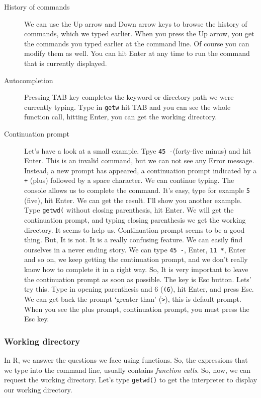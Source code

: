 \documentclass[
]{book}
\begin{document}
\begin{description}
\item[History of commands]
We can use the Up arrow and Down arrow keys to
browse the history of commands, which we typed earlier. When you
press the Up arrow, you get the commands you typed
earlier at the command line. Of course you can modify them as well.
You can hit Enter at any time to run the command that is
currently displayed.
\item[Autocompletion]
Pressing TAB key completes the keyword or directory path
we were currently typing. Type in \texttt{getw} hit TAB and you
can see the whole function call, hitting Enter, you can
get the working directory.
\item[Continuation prompt]
Let's have a look at a small example. Tpye \texttt{45\ -}(forty-five minus)
and hit Enter. This is an invalid command, but we can not
see any Error message. Instead, a new prompt has appeared, a
continuation prompt indicated by a \texttt{+} (plus) followed by a space
character. We can continue typing. The console allows us to complete
the command. It's easy, type for example \texttt{5} (five), hit
Enter. We can get the result. I'll show you another
example. Type \texttt{getwd(} without closing parenthesis, hit
Enter. We will get the continuation prompt, and typing
closing parenthesis we get the working directory. It seems to help
us. Continuation prompt seems to be a good thing. But, It is not. It
is a really confusing feature. We can easily find ourselves in a
never ending story. We can type \texttt{45\ -}, Enter, \texttt{11\ *},
Enter and so on, we keep getting the continuation prompt,
and we don't really know how to complete it in a right way. So, It
is very important to leave the continuation prompt as soon as
possible. The key is Esc button. Lets' try this. Type in
opening parenthesis and 6 (\texttt{(6}), hit Enter, and press
Esc. We can get back the prompt `greater than' (\texttt{\textgreater{}}),
this is default prompt. When you see the plus prompt, continuation
prompt, you must press the Esc key.
\end{description}

\hypertarget{working-directory}{%
\subsubsection{Working directory}\label{working-directory}}

In R, we answer the questions we face using functions. So, the
expressions that we type into the command line, usually contains
\emph{function calls}. So, now, we can request the working directory. Let's
type \texttt{getwd()} to get the interpreter to display our working directory.
\end{document}
